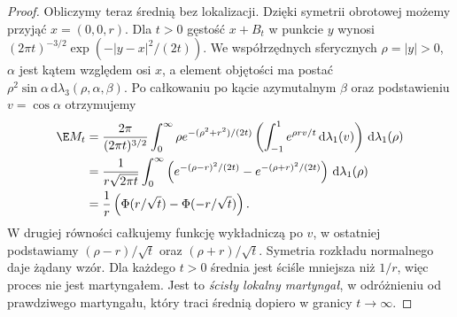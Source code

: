 \begin{proof}
Obliczymy teraz średnią bez lokalizacji.
Dzięki symetrii obrotowej możemy przyjąć
$x=(0,0,r)$. Dla $t>0$ gęstość $x+B_t$
w punkcie $y$ wynosi
$(2\pi t)^{-3/2}\exp(-|y-x|^2/(2t))$.
We współrzędnych sferycznych
$\rho=|y|>0$, $\alpha$ jest kątem względem osi
$x$, a element objętości ma postać
$\rho^2\sin\alpha\,\mathrm d\lambda_3(\rho,\alpha,\beta)$.
Po całkowaniu po kącie azymutalnym $\beta$
oraz podstawieniu $v=\cos\alpha$ otrzymujemy
\[
\begin{aligned}
\E M_t
&=\frac{2\pi}{(2\pi t)^{3/2}}\int_0^\infty
\rho e^{-(\rho^2+r^2)/(2t)}
\left(\int_{-1}^1 e^{\rho rv/t}\,\mathrm d\lambda_1(v)\right)
\,\mathrm d\lambda_1(\rho)\\
&=\frac1{r\sqrt{2\pi t}}\int_0^\infty
\left(e^{-(\rho-r)^2/(2t)}-
e^{-(\rho+r)^2/(2t)}\right)
\,\mathrm d\lambda_1(\rho)\\
&=\frac1r\left(\Phi(r/\sqrt t)-\Phi(-r/\sqrt t)\right).
\end{aligned}
\]
W drugiej równości całkujemy funkcję wykładniczą
po $v$, w ostatniej podstawiamy
$(\rho-r)/\sqrt t$ oraz $(\rho+r)/\sqrt t$.
Symetria rozkładu normalnego daje żądany wzór.
Dla każdego $t>0$ średnia jest ściśle mniejsza
niż $1/r$, więc proces nie jest martyngałem.
Jest to \emph{ścisły lokalny martyngał},
w odróżnieniu od prawdziwego martyngału,
który traci średnią dopiero w granicy
$t\to\infty$.
\end{proof}

